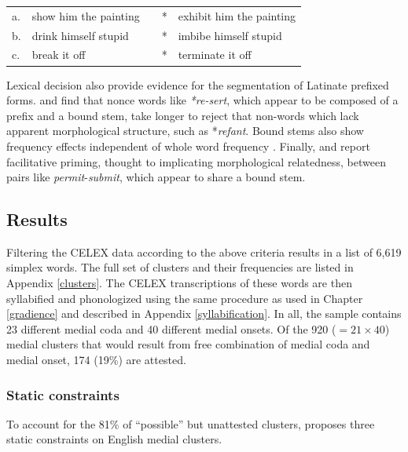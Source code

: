 \begin{example}
\label{harley}
\begin{tabular}{l l l l@{} l}
a. & {show him the painting} & \alt{} & * & {exhibit him the painting} \\
b. & {drink himself stupid}  & \alt{} & * & {imbibe himself stupid}    \\
c. & {break it off}          & \alt{} & * & {terminate it off}         \\
\end{tabular}
\end{example}

Lexical decision also provide evidence for the segmentation of Latinate prefixed forms.
\citet{Taft1975,Taft1976} and \citet{Taft1986} find that nonce words like \emph{*re-sert}, which appear to be composed of a prefix and a bound stem, take longer to reject that non-words which lack apparent morphological structure, such as *\emph{refant}. 
Bound stems also show frequency effects independent of whole word frequency \citep{Taft1979,Taft2006}.
Finally, \citet{Emmorey1989} and \citet{Forster2000} report facilitative priming, thought to implicating morphological relatedness, between pairs like \emph{permit}-\emph{submit}, which appear to share a bound stem.

\subsection{Results}

Filtering the CELEX data according to the above criteria results in a list of 6,619 simplex words.
The full set of clusters and their frequencies are listed in Appendix \ref{clusters}.
The CELEX transcriptions of these words are then syllabified and phonologized using the same procedure as used in Chapter \ref{gradience} and described in Appendix \ref{syllabification}. 
In all, the sample contains 23 different medial coda and 40 different medial onsets.
Of the 920 ($= 21 \times 40$) medial clusters that would result from free combination of medial coda and medial onset, 174 (19\%) are attested.

\subsubsection{Static constraints}

To account for the 81\% of ``possible'' but unattested clusters, \citet{Pierrehumbert1994} proposes three static constraints on English medial clusters.

